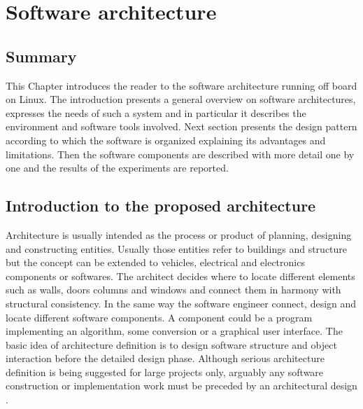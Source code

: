 
\chapter{Software architecture}
\label{chap:sixth
}
\ifpdf
    \graphicspath{{Chapter6/Figures/PNG/}{Chapter6/Figures/PDF/}{Chapter6/Figures/}}
\else
    \graphicspath{{Chapter6/Figures/EPS/}{Chapter6/Figures/}}
\fi

\section*{Summary}

This Chapter introduces the reader to the software architecture running off board on Linux. The introduction presents a  general overview on software architectures, expresses the needs of such a system and in particular it describes the environment and software tools involved. Next section presents the design pattern according to which the software is organized explaining its advantages and limitations. Then the software components are described with more detail one by one and the results of the experiments are reported. 
\section{Introduction to the proposed architecture}

Architecture is usually intended as the process or product of planning, designing and constructing entities. Usually those entities refer to buildings and structure but the concept can be extended to vehicles, electrical and electronics components or softwares. The architect decides where to locate different elements such as walls, doors columns and windows and connect them in harmony with structural consistency. In the same way the software engineer connect, design and locate different software components. A component could be a program implementing an algorithm, some conversion or a graphical user interface. The basic idea of architecture definition is to design software structure and object interaction before the detailed design phase. Although serious architecture definition is being suggested for large projects only, arguably any software construction or implementation work must be preceded by an architectural design \cite{msdn}.
